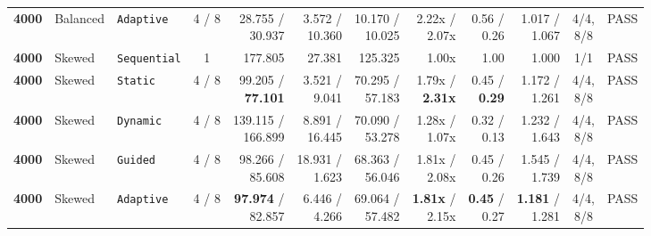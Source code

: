 \documentclass[11pt,a4paper]{article}
\renewcommand{\_}{\textunderscore\allowbreak}
\begin{document}
\begin{table}[H]
{\begin{tabular}{r l l c r r r r r r c c}
\textbf{4000} & Balanced & \texttt{Adaptive} & 4 / 8 & \makecell[r]{28.755 /\\ 30.937} & \makecell[r]{3.572 /\\ 10.360} & \makecell[r]{10.170 /\\ 10.025} & \makecell[r]{2.22x /\\ 2.07x} & \makecell[r]{0.56 /\\ 0.26} & \makecell[r]{1.017 /\\ 1.067} & \makecell[c]{4/4,\\ 8/8} & PASS \\
\textbf{4000} & Skewed & \texttt{Sequential} & 1 & 177.805 & 27.381 & 125.325 & 1.00x & 1.00 & 1.000 & 1/1 & PASS \\
\textbf{4000} & Skewed & \texttt{Static} & 4 / 8 & \makecell[r]{99.205 /\\ \textbf{77.101}} & \makecell[r]{3.521 /\\ 9.041} & \makecell[r]{70.295 /\\ 57.183} & \makecell[r]{1.79x /\\ \textbf{2.31x}} & \makecell[r]{0.45 /\\ \textbf{0.29}} & \makecell[r]{1.172 /\\ 1.261} & \makecell[c]{4/4,\\ 8/8} & PASS \\
\textbf{4000} & Skewed & \texttt{Dynamic} & 4 / 8 & \makecell[r]{139.115 /\\ 166.899} & \makecell[r]{8.891 /\\ 16.445} & \makecell[r]{70.090 /\\ 53.278} & \makecell[r]{1.28x /\\ 1.07x} & \makecell[r]{0.32 /\\ 0.13} & \makecell[r]{1.232 /\\ 1.643} & \makecell[c]{4/4,\\ 8/8} & PASS \\
\textbf{4000} & Skewed & \texttt{Guided} & 4 / 8 & \makecell[r]{98.266 /\\ 85.608} & \makecell[r]{18.931 /\\ 1.623} & \makecell[r]{68.363 /\\ 56.046} & \makecell[r]{1.81x /\\ 2.08x} & \makecell[r]{0.45 /\\ 0.26} & \makecell[r]{1.545 /\\ 1.739} & \makecell[c]{4/4,\\ 8/8} & PASS \\
\textbf{4000} & Skewed & \texttt{Adaptive} & 4 / 8 & \makecell[r]{\textbf{97.974} /\\ 82.857} & \makecell[r]{6.446 /\\ 4.266} & \makecell[r]{69.064 /\\ 57.482} & \makecell[r]{\textbf{1.81x} /\\ 2.15x} & \makecell[r]{\textbf{0.45} /\\ 0.27} & \makecell[r]{\textbf{1.181} /\\ 1.281} & \makecell[c]{4/4,\\ 8/8} & PASS \\

\end{tabular}}
\end{table}
\end{document}
